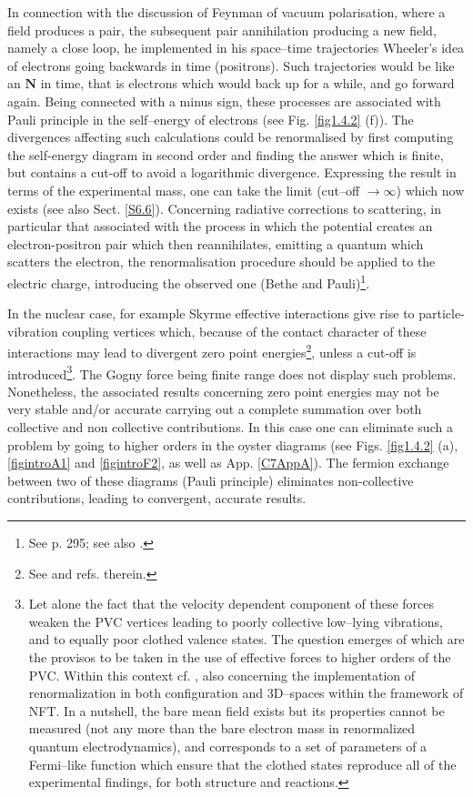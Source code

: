 \begin{subappendices}
 In connection with the discussion of Feynman of vacuum polarisation, where a field produces a pair,
 the subsequent pair annihilation producing a new field, namely a close loop, he implemented in his space--time trajectories 
 Wheeler's idea of electrons going backwards in time (positrons).  Such trajectories would be like an $\mathbf N$ in time,
 that is electrons which would back up for a while, and go forward again. Being connected 
 with a minus sign, these processes are associated with Pauli principle in the self--energy of electrons
 (see Fig. \ref{fig1.4.2} (f)). 
 The divergences affecting
 such calculations  could be renormalised by first computing the self-energy  diagram in second order and finding the answer which is finite, but contains a cut-off
 to avoid a logarithmic divergence. Expressing the result in terms of the experimental mass, one can take 
 the limit (cut--off $\to \infty$) which now exists (see also Sect. \ref{S6.6}).
 Concerning radiative corrections to scattering, in particular that associated with the process
 in which the potential creates an electron-positron pair which then reannihilates, emitting a quantum which scatters the
 electron, the renormalisation procedure should be applied to the electric charge, introducing 
 the observed one (Bethe and Pauli)\footnote{See \cite{Mehra:96} p. 295; see also \cite{Bjorken:98}.}.
 
 In the nuclear case, for example Skyrme effective interactions give 
 rise to particle-vibration coupling vertices which, because of the contact character of these interactions 
 may lead to divergent zero point energies\footnote{See \cite{Hellemans:13,Pastore:15} and refs. therein.}, unless a cut-off is introduced\footnote{Let alone the fact that the velocity dependent component of these forces weaken the PVC vertices leading to poorly collective low--lying vibrations, and to equally poor clothed valence states. The question emerges of which are the provisos to be taken in the use of effective forces to higher orders of the PVC. Within this context cf. \cite{Mahaux:85}, also \cite{Broglia:16,Barranco:17} concerning the implementation of renormalization in both configuration and 3D--spaces within the framework of NFT. In a nutshell, the bare mean field exists but its properties cannot be measured (not any more than the bare electron mass in renormalized quantum electrodynamics), and corresponds to a set of parameters of a Fermi--like function which ensure that the clothed states reproduce all of the experimental findings, for both structure and reactions.}.
 The Gogny force being finite range does not display such problems. Nonetheless, 
 the associated results concerning zero point energies may not be very stable and/or accurate 
 carrying out a complete summation over both collective and non collective contributions. 
 In this case one can eliminate such a  problem by going to higher orders in the oyster diagrams (see Figs. \ref{fig1.4.2} (a), \ref{figintroA1} and \ref{figintroF2}, as well as App. \ref{C7AppA}). 
 The fermion exchange between two of these diagrams (Pauli principle)  eliminates  non-collective
 contributions, leading to convergent, accurate results.
 

\end{subappendices}
